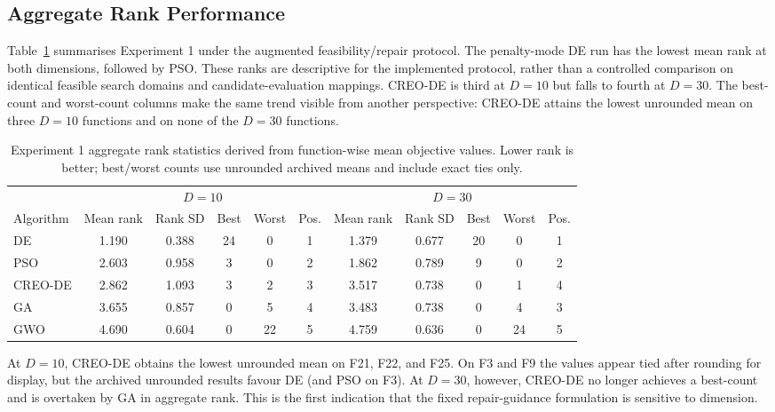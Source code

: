 \documentclass[journal]{IEEEtran}
\begin{document}
\subsection{Aggregate Rank Performance}

Table~\ref{tab:ranks} summarises Experiment 1 under the augmented feasibility/repair protocol. The penalty-mode DE run has the lowest mean rank at both dimensions, followed by PSO. These ranks are descriptive for the implemented protocol, rather than a controlled comparison on identical feasible search domains and candidate-evaluation mappings. CREO-DE is third at $D=10$ but falls to fourth at $D=30$. The best-count and worst-count columns make the same trend visible from another perspective: CREO-DE attains the lowest unrounded mean on three $D=10$ functions and on none of the $D=30$ functions.

\begin{table}[t]
\centering
\caption{Experiment 1 aggregate rank statistics derived from function-wise mean objective values. Lower rank is better; best/worst counts use unrounded archived means and include exact ties only.}
\label{tab:ranks}
\small
\begin{tabular}{lccccc|ccccc}
\toprule
& \multicolumn{5}{c}{$D=10$} & \multicolumn{5}{c}{$D=30$}\\
\cmidrule(lr){2-6}\cmidrule(lr){7-11}
Algorithm & Mean rank & Rank SD & Best & Worst & Pos. &
Mean rank & Rank SD & Best & Worst & Pos.\\
\midrule
DE      & 1.190 & 0.388 & 24 & 0  & 1 & 1.379 & 0.677 & 20 & 0  & 1\\
PSO     & 2.603 & 0.958 & 3  & 0  & 2 & 1.862 & 0.789 & 9  & 0  & 2\\
CREO-DE & 2.862 & 1.093 & 3  & 2  & 3 & 3.517 & 0.738 & 0  & 1  & 4\\
GA      & 3.655 & 0.857 & 0  & 5  & 4 & 3.483 & 0.738 & 0  & 4  & 3\\
GWO     & 4.690 & 0.604 & 0  & 22 & 5 & 4.759 & 0.636 & 0  & 24 & 5\\
\bottomrule
\end{tabular}
\end{table}

At $D=10$, CREO-DE obtains the lowest unrounded mean on F21, F22, and F25. On F3 and F9 the values appear tied after rounding for display, but the archived unrounded results favour DE (and PSO on F3). At $D=30$, however, CREO-DE no longer achieves a best-count and is overtaken by GA in aggregate rank. This is the first indication that the fixed repair-guidance formulation is sensitive to dimension.
\end{document}
